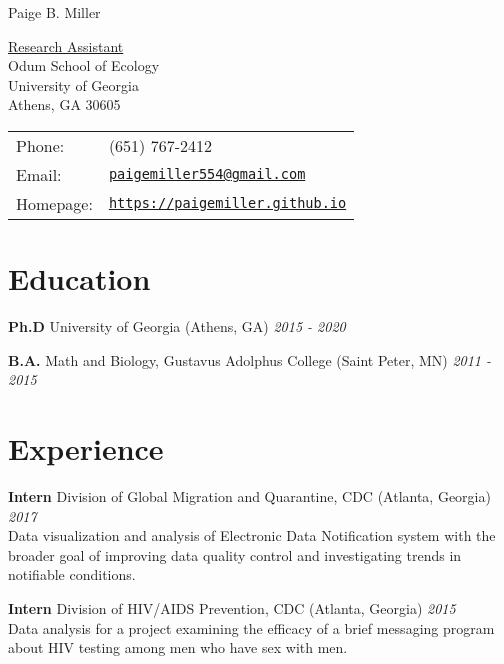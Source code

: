 \documentclass[letterpaper]{article}
\def\name{Paige B. Miller}
\renewenvironment{itemize}{
  \begin{list}{}{
    \setlength{\leftmargin}{1.5em}
  }
}{
  \end{list}
}
\begin{document}
{\huge \name}


\vspace{0.25in}

\begin{minipage}{0.45\linewidth}
  \href{}{Research Assistant} \\
  Odum School of Ecology \\
  University of Georgia \\
  Athens, GA 30605
\end{minipage}
\begin{minipage}{0.45\linewidth}
  \begin{tabular}{ll}
    Phone: & (651) 767-2412 \\
    Email: & \href{mailto:paige.miller@uga.edu}{\tt paigemiller554@gmail.com} \\
    Homepage: & \href{https://paigemiller.github.io}{\tt https://paigemiller.github.io} \\
  \end{tabular}
\end{minipage}

\section*{Education}

\begin{itemize}
  \item \textbf{Ph.D} University of Georgia (Athens, GA) 	\hfill \textit{2015 - 2020}
  \item \textbf{B.A.} Math and Biology, Gustavus Adolphus College (Saint Peter, MN) \hfill  \textit{2011 - 2015}
\end{itemize}

\section*{Experience}

\begin{itemize}
  \item  \textbf{Intern} Division of Global Migration and Quarantine, CDC (Atlanta, Georgia)
   \hfill  \textit{2017}
   \\ Data visualization and analysis of Electronic Data Notification system with the broader goal of improving data quality control and investigating trends in notifiable conditions.
  \item  \textbf{Intern} Division of HIV/AIDS Prevention, CDC (Atlanta, Georgia)   \hfill  \textit{2015}
  \\ Data analysis for a project examining the efficacy of a brief messaging program about HIV testing among men who have sex with men. 
\end{itemize}
\end{document}

